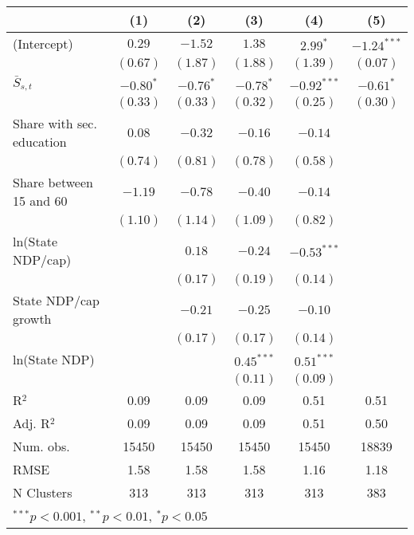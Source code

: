 
\begin{tabular}{l c c c c c }
\toprule
 & (1) & (2) & (3) & (4) & (5) \\
\midrule
(Intercept)               & $0.29$      & $-1.52$     & $1.38$       & $2.99^{*}$    & $-1.24^{***}$ \\
                          & $(0.67)$    & $(1.87)$    & $(1.88)$     & $(1.39)$      & $(0.07)$      \\
$\bar{S}_{s,t}$           & $-0.80^{*}$ & $-0.76^{*}$ & $-0.78^{*}$  & $-0.92^{***}$ & $-0.61^{*}$   \\
                          & $(0.33)$    & $(0.33)$    & $(0.32)$     & $(0.25)$      & $(0.30)$      \\
Share with sec. education & $0.08$      & $-0.32$     & $-0.16$      & $-0.14$       &               \\
                          & $(0.74)$    & $(0.81)$    & $(0.78)$     & $(0.58)$      &               \\
Share between 15 and 60   & $-1.19$     & $-0.78$     & $-0.40$      & $-0.14$       &               \\
                          & $(1.10)$    & $(1.14)$    & $(1.09)$     & $(0.82)$      &               \\
ln(State NDP/cap)         &             & $0.18$      & $-0.24$      & $-0.53^{***}$ &               \\
                          &             & $(0.17)$    & $(0.19)$     & $(0.14)$      &               \\
State NDP/cap growth      &             & $-0.21$     & $-0.25$      & $-0.10$       &               \\
                          &             & $(0.17)$    & $(0.17)$     & $(0.14)$      &               \\
ln(State NDP)             &             &             & $0.45^{***}$ & $0.51^{***}$  &               \\
                          &             &             & $(0.11)$     & $(0.09)$      &               \\
\midrule
R$^2$                     & 0.09        & 0.09        & 0.09         & 0.51          & 0.51          \\
Adj. R$^2$                & 0.09        & 0.09        & 0.09         & 0.51          & 0.50          \\
Num. obs.                 & 15450       & 15450       & 15450        & 15450         & 18839         \\
RMSE                      & 1.58        & 1.58        & 1.58         & 1.16          & 1.18          \\
N Clusters                & 313         & 313         & 313          & 313           & 383           \\
\bottomrule
\multicolumn{6}{l}{\tiny{$^{***}p<0.001$, $^{**}p<0.01$, $^*p<0.05$}}
\end{tabular}
